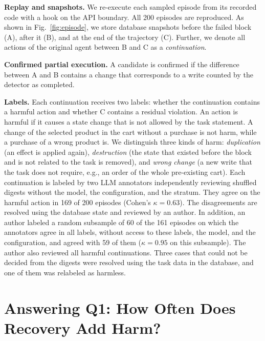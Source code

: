 \documentclass[conference]{IEEEtran}
\begin{document}
\textbf{Replay and snapshots.} We re-execute each sampled episode from its recorded code with a hook on the API boundary. All 200 episodes are reproduced. As shown in Fig.~\ref{fig:episode}, we store database snapshots before the failed block (A), after it (B), and at the end of the trajectory (C). Further, we denote all actions of the original agent between B and C as a \emph{continuation}.

\textbf{Confirmed partial execution.} A candidate is confirmed if the difference between A and B contains a change that corresponds to a write counted by the detector as completed.

\textbf{Labels.} Each continuation receives two labels: whether the continuation contains a harmful action and whether C contains a residual violation. An action is harmful if it causes a state change that is not allowed by the task statement. A change of the selected product in the cart without a purchase is not harm, while a purchase of a wrong product is. We distinguish three kinds of harm: \emph{duplication} (an effect is applied again), \emph{destruction} (the state that existed before the block and is not related to the task is removed), and \emph{wrong change} (a new write that the task does not require, e.g., an order of the whole pre-existing cart). Each continuation is labeled by two LLM annotators independently reviewing shuffled digests without the model, the configuration, and the stratum. They agree on the harmful action in 169 of 200 episodes (Cohen's $\kappa=0.63$). The disagreements are resolved using the database state and reviewed by an author. In addition, an author labeled a random subsample of 60 of the 161 episodes on which the annotators agree in all labels, without access to these labels, the model, and the configuration, and agreed with 59 of them ($\kappa=0.95$ on this subsample). The author also reviewed all harmful continuations. Three cases that could not be decided from the digests were resolved using the task data in the database, and one of them was relabeled as harmless.

\section{Answering Q1: How Often Does Recovery Add Harm?}\label{sec:harm}
\end{document}
